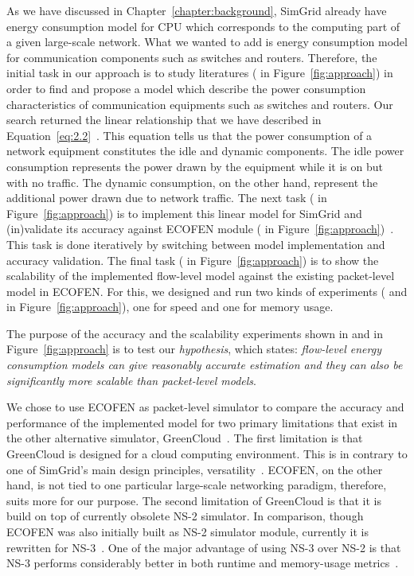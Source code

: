 As we have discussed in Chapter~\ref{chapter:background}, SimGrid already have energy consumption model for CPU which corresponds to the computing part of a given large-scale network. What we wanted to add is energy consumption model for communication components such as switches and routers. Therefore, the initial task in our approach is to study literatures ( in Figure~\ref{fig:approach}) in order to find and propose a model which describe the power consumption characteristics of communication equipments such as switches and routers. Our search returned the linear relationship that we have described in Equation~\ref{eq:2.2}~\cite{Sivaraman,DBLP:journals/comcom/BeisterDAK14,DBLP:conf/networking/MahadevanSBR09,DBLP:conf/sigcomm/MahadevanBS10}. This equation tells us that the power consumption of a network equipment constitutes the idle and dynamic components. The idle power consumption represents the power drawn by the equipment while it is on but with no traffic. The dynamic consumption, on the other hand, represent the additional power drawn due to network traffic. The next task ( in Figure~\ref{fig:approach}) is to implement this linear model for SimGrid and (in)validate its accuracy against ECOFEN module ( in Figure~\ref{fig:approach})~\cite{DBLP:conf/wowmom/OrgerieLLL11,DBLP:conf/cloudnet/CorneaOL14}. This task is done iteratively by switching between model implementation and accuracy validation. The final task ( in Figure~\ref{fig:approach}) is to show the scalability of the implemented flow-level model against the existing packet-level model in ECOFEN. For this, we designed and run two kinds of experiments ( and  in Figure~\ref{fig:approach}), one for speed and one for memory usage. 

The purpose of the accuracy and the scalability experiments shown in  and  in Figure~\ref{fig:approach} is to test our \emph{hypothesis}, which states: \emph{flow-level energy consumption models can give reasonably accurate estimation and they can also be significantly more scalable than packet-level models}. 

We chose to use ECOFEN as packet-level simulator to compare the accuracy and performance of the implemented model for two primary limitations that exist in the other alternative simulator, GreenCloud~\cite{DBLP:journals/tjs/KliazovichBK12}. The first limitation is that GreenCloud is designed for a  cloud computing environment. This is in contrary to one of SimGrid's main design principles, versatility~\cite{DBLP:journals/jpdc/CasanovaGLQS14}. ECOFEN, on the other hand, is not tied to one particular large-scale networking paradigm, therefore, suits more for our purpose. The second limitation of GreenCloud is that it is build on top of currently obsolete NS-2 simulator. In comparison, though ECOFEN was also initially built as NS-2 simulator module, currently it is rewritten for NS-3~\cite{DBLP:conf/cloudnet/CorneaOL14}. One of the major advantage of using NS-3 over NS-2 is that NS-3 performs considerably better in both runtime and memory-usage metrics~\cite{DBLP:conf/icc/WeingartnerLW09}.

